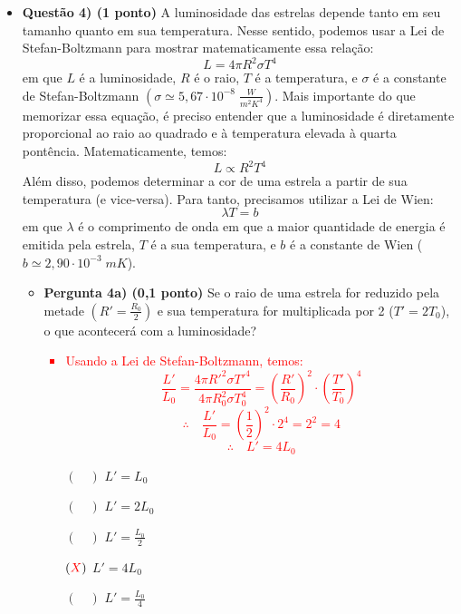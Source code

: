 \documentclass[a4paper, 12pt]{article}
\newcommand{\red}[1]{\textcolor{red}{#1}}
\begin{document}
\begin{flushleft}
\begin{itemize}
		\item \textbf{Questão 4) (1 ponto)} A luminosidade das estrelas depende tanto em seu tamanho quanto em sua temperatura. Nesse sentido, podemos usar a Lei de Stefan-Boltzmann para mostrar matematicamente essa relação:
			$$L=4 \pi R^2 \sigma T^4$$
			em que $L$ é a luminosidade, $R$ é o raio, $T$ é a temperatura, e $\sigma$ é a constante de Stefan-Boltzmann $\left( \sigma \simeq 5,67 \cdot 10^{-8} \; \frac{W}{m^2K^4} \right)$. \linebreak \linebreak
			Mais importante do que memorizar essa equação, é preciso entender que a luminosidade é diretamente proporcional ao raio ao quadrado e à temperatura elevada à quarta pontência. Matematicamente, temos:
				$$L \propto R^2 T^4$$
			Além disso, podemos determinar a cor de uma estrela a partir de sua temperatura (e vice-versa). Para tanto, precisamos utilizar a Lei de Wien:
				$$\lambda T = b$$
				em que $\lambda$ é o comprimento de onda em que a maior quantidade de energia é emitida pela estrela, $T$ é a sua temperatura, e $b$ é a constante de Wien ($b \simeq 2,90 \cdot 10^{-3} \; mK$). \linebreak \linebreak
				\begin{itemize}
					\item \textbf{Pergunta 4a) (0,1 ponto)} Se o raio de uma estrela for reduzido pela metade $\left( R'=\frac{R_0}{2} \right)$ e sua temperatura for multiplicada por 2 ($T'=2T_0$), o que acontecerá com a luminosidade?
						\red{\begin{itemize}
							\item Usando a Lei de Stefan-Boltzmann, temos:
								$$\frac{L'}{L_0} = \frac{4 \pi R'^2 \sigma T'^4}{4 \pi R_0^2 \sigma T_0^4} = \left( \frac{R'}{R_0} \right)^2 \cdot \left( \frac{T'}{T_0} \right)^4$$
								$$\therefore \quad \frac{L'}{L_0} = \left( \frac{1}{2} \right)^2 \cdot 2^4 = 2^2 = 4$$
								$$\therefore \quad L' = 4 L_0$$
						\end{itemize}}
						\begin{itemize}
							\item[$(\quad)$] $L'=L_0$
							\item[$(\quad)$] $L'=2L_0$
							\item[$(\quad)$] $L'=\frac{L_0}{2}$
							\item[$(\red{X})$] $L'=4L_0$
							\item[$(\quad)$] $L'=\frac{L_0}{4}$
						\end{itemize}

\end{itemize}
\end{itemize}
\end{flushleft}
\end{document}
